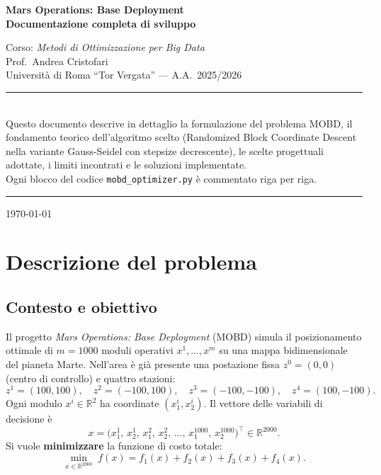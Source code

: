 \documentclass[12pt,a4paper]{article}
\theoremstyle{definition}
\newcommand{\R}{\mathbb{R}}
\newcommand{\T}{^{\top}}
\begin{document}

\begin{titlepage}
  \centering
  \vspace*{2cm}
  {\Huge\bfseries Mars Operations: Base Deployment\\[0.5em]
  \large Documentazione completa di sviluppo\par}
  \vspace{1.5cm}
  {\large Corso: \textit{Metodi di Ottimizzazione per Big Data}\\
  Prof.\ Andrea Cristofari\\
  Università di Roma ``Tor Vergata'' — A.A.\ 2025/2026\par}
  \vspace{2cm}
  \rule{0.8\textwidth}{0.4pt}\\[0.5em]
  {\small
  Questo documento descrive in dettaglio la formulazione del problema MOBD,
  il fondamento teorico dell'algoritmo scelto (Randomized Block Coordinate Descent
  nella variante Gauss-Seidel con stepsize decrescente), le scelte progettuali adottate,
  i limiti incontrati e le soluzioni implementate.\\
  Ogni blocco del codice \texttt{mobd\_optimizer.py} è commentato riga per riga.}\\[0.5em]
  \rule{0.8\textwidth}{0.4pt}
  \vfill
  {\small\today}
\end{titlepage}

\tableofcontents
\clearpage

\section{Descrizione del problema}

\subsection{Contesto e obiettivo}

Il progetto \textit{Mars Operations: Base Deployment} (MOBD) simula il posizionamento ottimale
di $m = 1000$ moduli operativi $x^1, \ldots, x^m$ su una mappa bidimensionale del pianeta Marte.
Nell'area è già presente una postazione fissa $z^0 = (0,0)$ (centro di controllo) e quattro stazioni:
\[
  z^1 = (100,100),\quad z^2 = (-100,100),\quad z^3 = (-100,-100),\quad z^4 = (100,-100).
\]
Ogni modulo $x^i \in \R^2$ ha coordinate $(x^i_1, x^i_2)$.
Il vettore delle variabili di decisione è
\[
  x = \bigl(x^1_1,\, x^1_2,\, x^2_1,\, x^2_2,\, \ldots,\, x^{1000}_1,\, x^{1000}_2\bigr)\T \in \R^{2000}.
\]
Si vuole \textbf{minimizzare} la funzione di costo totale:
\[
  \min_{x \in \R^{2000}} \; f(x) = f_1(x) + f_2(x) + f_3(x) + f_4(x).
\]
\end{document}
